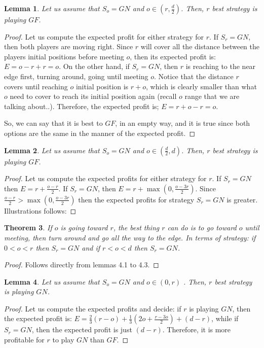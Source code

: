 \documentclass[a4paper,10pt]{article}
\newtheorem{theorem}{Theorem}[section]
\newtheorem{lemma}[theorem]{Lemma}
\newcommand\rob{\ensuremath{r}\xspace}
\newcommand\opp{\ensuremath{o}\xspace}
\newcommand{\gn}{\ensuremath{GN}\xspace}
\newcommand{\gf}{\ensuremath{GF}\xspace}
\begin{document}
\begin{lemma}
Let us assume that $S_{\opp}=\gn$ and $o\in\left(r,\frac{d}{2}\right)$. Then, \rob best strategy is playing $\gf$.
\end{lemma}
\begin{proof}
Let us compute the expected profit for either strategy for \rob. If $S_{\rob}=\gn$, then both players are moving right. Since \rob will cover all the distance between the players initial positions before meeting \opp, then its expected profit is: $E=o-r+r=o$. On the other hand, if $S_{\rob}=\gn$, then \rob is reaching to the near edge first, turning around, going until meeting \opp. Notice that the distance \rob covers until reaching \opp initial position is $r+o$, which is clearly smaller than what \opp need to cover to reach its initial position again (recall \opp range that we are talking about..). Therefore, the expected profit is; $E=r+o-r=o$.

So, we can say that it is best to $\gf$, in an empty way, and it is true since both options are the same in the manner of the expected profit.
\end{proof}

\begin{lemma}
Let us assume that $S_{\opp}=\gn$ and $o\in\left(\frac{d}{2},d\right)$. Then, \rob best strategy is playing $\gf$.
\end{lemma}
\begin{proof}
Let us compute the expected profits for either strategy for \rob.
If $S_{\rob}=\gn$ then $E=r+\frac{o-r}{2}$. If $S_{\rob}=\gn$, then $E=r+\max\left(0,\frac{o-3r}{2}\right)$. Since $\frac{o-r}{2} > \max\left(0,\frac{o-3r}{2}\right)$ then the expected profits for strategy $S_{\rob}=\gn$ is greater. Illustrations follows:
\end{proof}

\begin{theorem}
If \opp is going toward \rob, the best thing \rob can do is to go toward \opp until meeting, then turn around and go all the way to the edge. In terms of strategy: if $0<o<r$ then $S_{\rob}=\gn$ and if $r<o<d$ then $S_{\rob}=\gn$.
\end{theorem}
\begin{proof}
Follows directly from lemmas 4.1 to 4.3.
\end{proof}

\begin{lemma}
Let us assume that $S_{\opp}=\gn$ and $o\in\left(0,r\right)$ . Then, \rob best strategy is playing \gn.
\end{lemma}
\begin{proof}
Let us compute the expected profits and decide:
if \rob is playing \gn, then the expected profit is: $E=\frac{2}{3}(r-o) +\frac{1}{3}(2o+\frac{r-3o}{2}) + (d-r)$, while if $S_{\rob}=\gn$, then the expected profit is just $(d-r)$. Therefore, it is more profitable for \rob to play \gn than $\gf$.
\end{proof}
\end{document}
